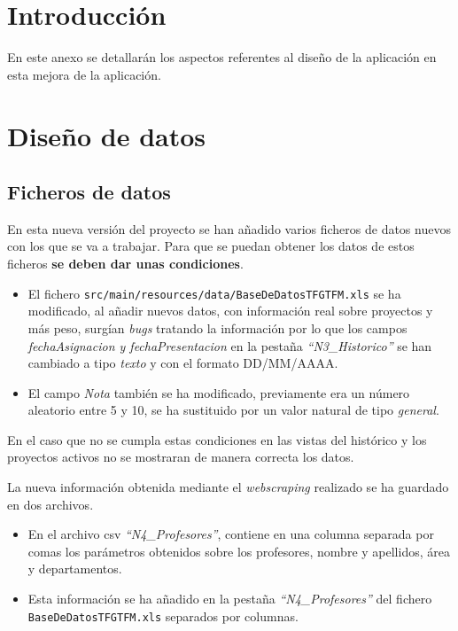 
\section{Introducción}
En este anexo se detallarán los aspectos referentes al diseño de la aplicación en esta mejora de la aplicación.

\section{Diseño de datos}

\subsection{Ficheros de datos}

En esta nueva versión del proyecto se han añadido varios ficheros de datos nuevos con los que se va a trabajar. Para que se puedan obtener los datos de estos ficheros \textbf{se deben dar unas condiciones}.

\begin{itemize}
	\item El fichero \texttt{src/main/resources/data/BaseDeDatosTFGTFM.xls} se ha modificado, al añadir nuevos datos, con información real sobre proyectos y más peso, surgían \emph{bugs} tratando la información por lo que los campos \emph{fechaAsignacion y fechaPresentacion} en la pestaña \emph{``N3\_Historico''} se han cambiado a tipo \emph{texto} y con el formato DD/MM/AAAA.
	\item El campo \emph{Nota} también se ha modificado, previamente era un número aleatorio entre 5 y 10, se ha sustituido por un valor natural de tipo \emph{general}.
\end{itemize}

En el caso que no se cumpla estas condiciones en las vistas del histórico
y los proyectos activos no se mostraran de manera correcta los datos.

La nueva información obtenida mediante el \emph{webscraping} realizado se ha guardado en dos archivos.
\begin{itemize}
	\item En el archivo csv \emph{``N4\_Profesores''}, contiene en una columna separada por comas los parámetros obtenidos sobre los profesores, nombre y apellidos, área y departamentos.
	\item Esta información se ha añadido en la pestaña \emph{``N4\_Profesores''} del fichero \texttt{BaseDeDatosTFGTFM.xls} separados por columnas.
\end{itemize}

